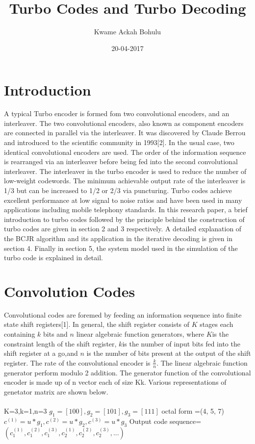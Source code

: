 \documentclass[20 pts]{article}
\title{Turbo Codes and Turbo Decoding}
\author{Kwame Ackah Bohulu}
\date{20-04-2017}
\begin{document}
\maketitle


\section{Introduction}
A typical Turbo encoder is formed fom two convolutional encoders, and an interleaver. The two convolutional encoders, also known as component encoders are connected in parallel via the interleaver. It was discovered by Claude Berrou and introduced to the scientific community in 1993[2]. In the usual case, two identical convolutional encoders are used. The order of the information sequence is rearranged via an interleaver before being fed into the second convolutional interleaver. The interleaver in the turbo encoder is used to reduce the number of low-weight codewords. The minimum achievable output rate of the interleaver is 1/3 but can be increased to 1/2 or 2/3 via puncturing. Turbo codes achieve excellent performance at low signal to noise ratios and have been used in many applications including mobile telephony standards. In this research paper, a brief introduction to turbo codes followed by the principle behind the construction of turbo codes are given in section 2 and 3 respectively. A detailed explanation of the  BCJR algorithm and its application in the iterative decoding is given in section 4. Finally in section 5, the system model used in the simulation of the turbo code is explained in detail.


\section{Convolution Codes}
Convolutional codes are foremed by feeding an information sequence into finite state shift registers[1]. In general, the shift register consists of $K$ stages each containing $k$ bits and $n$ linear algebraic function generators, where $K $is the constraint length of the shift register, $k $is the number of input bits fed into the shift register at a go,and $n$ is the number of bits present at the output of the shift register. The rate of the convolutional encoder is $\frac{k}{n}$. The linear algebraic function generator perform modulo 2 addition. The generator function of the convolutional encoder is made up of n vector each of size Kk. Various representations of genetator matrix are shown below.

\paragraph{}
K=3,k=1,n=3\newline
$g_1=[1 0 0], g_2=[1 0 1], g_3=[1 1 1]$\newline
octal form =(4, 5, 7)\newline
$c^{(1)}=u*g_1,c^{(2)}=u*g_2,c^{(3)}=u*g_3$\newline
Output code sequence=$(c_1^{(1)},c_1^{(2)},c_1^{(3)},c_2^{(1)},c_2^{(2)},c_2^{(3)},...)$
\end{document}
